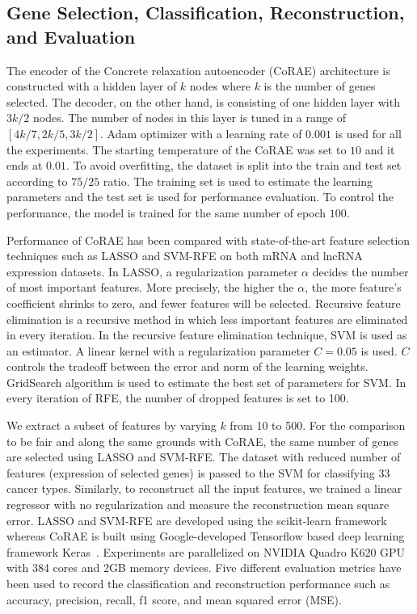 \documentclass{bioinfo}
\begin{document}
\subsection{Gene Selection, Classification, Reconstruction, and Evaluation} \label{method-details}
The encoder of the Concrete relaxation autoencoder (CoRAE) architecture is constructed with a hidden layer of $k$ nodes where $k$ is the number of genes selected. The decoder, on the other hand, is consisting of one hidden layer with $3k/2$ nodes. 
The number of nodes in this layer is tuned in a range of $[4k/7, 2k/5, 3k/2]$. 
Adam optimizer with a learning rate of $0.001$ is used for all the experiments. 
The starting temperature of the CoRAE was set to $10$ and it ends at $0.01$. 
To avoid overfitting, the dataset is split into the train and test set according to $75/25$ ratio. 
The training set is used to estimate the learning parameters and the test set is used for performance evaluation. 
To control the performance, the model is trained for the same number of epoch $100$.

 
Performance of CoRAE has been compared with state-of-the-art feature selection techniques such as LASSO and SVM-RFE on both mRNA and lncRNA expression datasets. 
In LASSO, a regularization parameter $\alpha$ decides the number of most important features. 
More precisely, the higher the $\alpha$, the more feature's coefficient shrinks to zero, and fewer features will be selected. Recursive feature elimination is a recursive method in which less important features are eliminated in every iteration. 
In the recursive feature elimination technique, SVM is used as an estimator. 
A linear kernel with a regularization parameter $C=0.05$ is used. $C$ controls the tradeoff between the error and norm of the learning weights. 
GridSearch algorithm is used to estimate the best set of parameters for SVM. 
In every iteration of RFE, the number of dropped features is set to 100. 

We extract a subset of features by varying $k$ from 10 to 500. For the comparison to be fair and along the same grounds with CoRAE, the same number of genes are selected using LASSO and SVM-RFE. 
The dataset with reduced number of features (expression of selected genes) is passed to the SVM for classifying 33 cancer types. Similarly, to reconstruct all the input features, we trained a linear regressor with no regularization and measure the reconstruction mean square error. 
LASSO and SVM-RFE are developed using the scikit-learn framework~\citep{scikit-learn} whereas CoRAE is built using Google-developed Tensorflow \citep{tensorflow2015-whitepaper} based deep learning framework Keras~\citep{chollet2015keras}. Experiments are parallelized on NVIDIA Quadro K620 GPU with 384 cores and 2GB memory devices. Five different evaluation metrics have been used to record the classification and reconstruction performance such as accuracy, precision, recall, f1 score, and mean squared error (MSE). 
\end{document}
